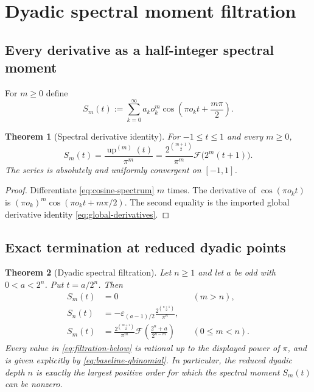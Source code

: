 \documentclass[11pt,oneside]{article}
\newtheorem{theorem}{Theorem}[section]
\theoremstyle{definition}
\theoremstyle{remark}
\newcommand{\Up}{\operatorname{up}}
\newcommand{\eps}{\varepsilon}
\newcommand{\GF}{\mathcal F}
\begin{document}
\section{Dyadic spectral moment filtration}\label{sec:moment-filtration}

\subsection{Every derivative as a half-integer spectral moment}

For $m\ge0$ define
\begin{equation}\label{eq:S-m-def}
 S_m(t):=\sum_{k=0}^{\infty}a_ko_k^m
 \cos\!\left(\pi o_kt+\frac{m\pi}{2}\right).
\end{equation}

\begin{theorem}[Spectral derivative identity]\label{thm:spectral-derivative}
For $-1\le t\le1$ and every $m\ge0$,
\begin{equation}\label{eq:spectral-derivative}
 \boxed{
 S_m(t)=\frac{\Up^{(m)}(t)}{\pi^m}
 =\frac{2^{\binom{m+1}{2}}}{\pi^m}
 \GF\bigl(2^m(t+1)\bigr).}
\end{equation}
The series is absolutely and uniformly convergent on $[-1,1]$.
\end{theorem}

\begin{proof}
Differentiate \eqref{eq:cosine-spectrum} $m$ times.  The derivative of
$\cos(\pi o_kt)$ is
$(\pi o_k)^m\cos(\pi o_kt+m\pi/2)$.  The second equality is the imported
global derivative identity \eqref{eq:global-derivatives}.
\end{proof}

\subsection{Exact termination at reduced dyadic points}

\begin{theorem}[Dyadic spectral filtration]\label{thm:dyadic-filtration}
Let $n\ge1$ and let $a$ be odd with $0<a<2^n$.  Put $t=a/2^n$.  Then
\begin{align}
 S_m(t)&=0 &&(m>n),
 \label{eq:filtration-above}\\
 S_n(t)&=-\eps_{(a-1)/2}
 \frac{2^{\binom{n+1}{2}}}{\pi^n},
 \label{eq:filtration-critical}\\
 S_m(t)&=\frac{2^{\binom{m+1}{2}}}{\pi^m}
 \GF\!\left(\frac{2^n+a}{2^{n-m}}\right)
 &&(0\le m<n).
 \label{eq:filtration-below}
\end{align}
Every value in \eqref{eq:filtration-below} is rational up to the displayed
power of $\pi$, and is given explicitly by \eqref{eq:baseline-qbinomial}.
In particular, the reduced dyadic depth $n$ is exactly the largest positive
order for which the spectral moment $S_m(t)$ can be nonzero.
\end{theorem}
\end{document}
